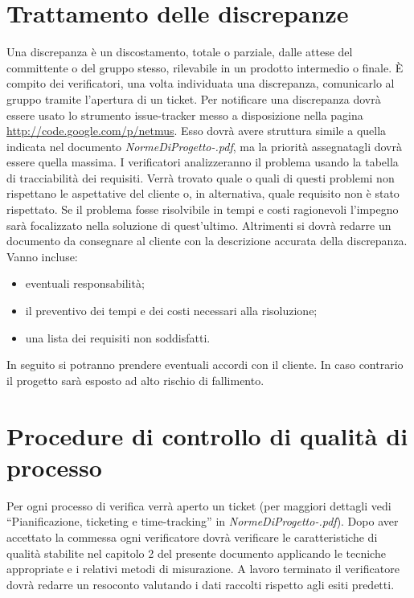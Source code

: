 \section{Trattamento delle discrepanze}

Una discrepanza \`e un discostamento, totale o parziale, dalle attese del
committente o del gruppo stesso, rilevabile in un prodotto intermedio
o finale. \`E compito dei verificatori, una volta individuata una discrepanza,
comunicarlo al gruppo tramite l'apertura di un ticket. Per notificare una
discrepanza dovr\`a essere usato lo strumento issue-tracker messo a disposizione nella pagina \url{http://code.google.com/p/netmus}. 
Esso dovr\`a avere struttura simile a quella indicata nel
documento \emph{NormeDiProgetto-\versionenormeprogetto.pdf}, ma la priorit\`a assegnatagli dovr\`a essere quella
massima. I verificatori analizzeranno il problema usando la tabella di
tracciabilit\`a dei requisiti. Verr\`a trovato quale o quali di questi problemi non
rispettano le aspettative del cliente o, in alternativa, quale requisito non \`e
stato rispettato. Se il problema fosse risolvibile in tempi e costi ragionevoli
l'impegno sar\`a focalizzato nella soluzione di quest'ultimo. Altrimenti si dovr\`a
redarre un documento da consegnare al cliente con la descrizione accurata della
discrepanza.\\

Vanno incluse:

\begin{itemize}

\item eventuali responsabilit\`a;
\item il preventivo dei tempi e dei costi necessari alla risoluzione;
\item una lista dei requisiti non soddisfatti.

\end{itemize}

In seguito si potranno prendere eventuali accordi con il cliente. In caso
contrario il progetto sar\`a esposto ad alto rischio di fallimento.

\section{Procedure di controllo di qualit\`a di processo}
Per ogni processo di verifica verr\`a aperto un ticket (per maggiori dettagli vedi
``Pianificazione, ticketing e time-tracking'' in \emph{NormeDiProgetto-\versionenormeprogetto.pdf}). Dopo aver
accettato la commessa ogni verificatore dovr\`a verificare le caratteristiche di
qualit\`a stabilite nel capitolo 2 del presente documento applicando le tecniche
appropriate e i relativi metodi di misurazione. A lavoro terminato il
verificatore dovr\`a redarre un resoconto valutando i dati raccolti rispetto agli
esiti predetti.

